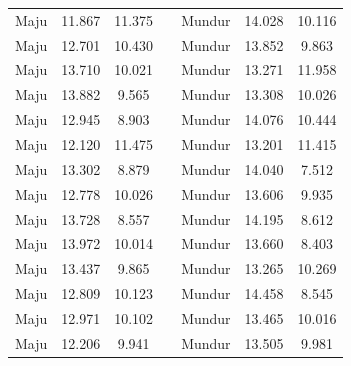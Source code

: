\begin{longtable}{|c|c|c|c|c|c|c|}
  Maju           & 11.867              & 11.375           &  & Mundur         & 14.028              & 10.116           \\ \cline{1-3} \cline{5-7} 
  Maju           & 12.701              & 10.430           &  & Mundur         & 13.852              & 9.863            \\ \cline{1-3} \cline{5-7} 
  Maju           & 13.710              & 10.021           &  & Mundur         & 13.271              & 11.958           \\ \cline{1-3} \cline{5-7} 
  Maju           & 13.882              & 9.565            &  & Mundur         & 13.308              & 10.026           \\ \cline{1-3} \cline{5-7} 
  Maju           & 12.945              & 8.903            &  & Mundur         & 14.076              & 10.444           \\ \cline{1-3} \cline{5-7} 
  Maju           & 12.120              & 11.475           &  & Mundur         & 13.201              & 11.415           \\ \cline{1-3} \cline{5-7} 
  Maju           & 13.302              & 8.879            &  & Mundur         & 14.040              & 7.512            \\ \cline{1-3} \cline{5-7} 
  Maju           & 12.778              & 10.026           &  & Mundur         & 13.606              & 9.935            \\ \cline{1-3} \cline{5-7} 
  Maju           & 13.728              & 8.557            &  & Mundur         & 14.195              & 8.612            \\ \cline{1-3} \cline{5-7} 
  Maju           & 13.972              & 10.014           &  & Mundur         & 13.660              & 8.403            \\ \cline{1-3} \cline{5-7} 
  Maju           & 13.437              & 9.865            &  & Mundur         & 13.265              & 10.269           \\ \cline{1-3} \cline{5-7} 
  Maju           & 12.809              & 10.123           &  & Mundur         & 14.458              & 8.545            \\ \cline{1-3} \cline{5-7} 
  Maju           & 12.971              & 10.102           &  & Mundur         & 13.465              & 10.016           \\ \cline{1-3} \cline{5-7} 
  Maju           & 12.206              & 9.941            &  & Mundur         & 13.505              & 9.981            \\ \cline{1-3} \cline{5-7} 

\end{longtable}
